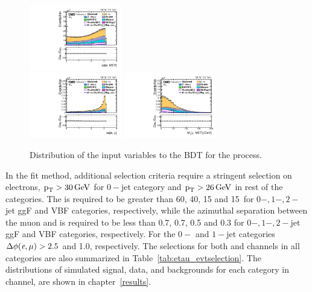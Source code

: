 \begin{figure}[htbp!]
  \includegraphics[width=0.36\textwidth]{plots/chapter6/emu/dPhiEMET.pdf}\\
  \includegraphics[width=0.36\textwidth]{plots/chapter6/emu/dPhiEMu.pdf}
  \includegraphics[width=0.36\textwidth]{plots/chapter6/emu/MTMuMET.pdf}\\
  \caption{Distribution of the input variables to the BDT for the \emu process.}
  \label{fig:input_em}
\end{figure}

In the \mcol fit method, additional selection criteria require a stringent selection on electrons, $\text{p}_\text{T} > 30 \,\text{Ge\hspace{-.08em}V}$ for $0-$jet category and $\text{p}_\text{T} > 26 \,\text{Ge\hspace{-.08em}V}$ in rest of the categories. The \mtemet is required to be greater than 60, 40, 15 and 15~\GeV for $0-, 1-, 2-$jet ggF and VBF categories, respectively, while the azimuthal separation between the muon and \ptvecmiss is required to be less than 0.7, 0.7, 0.5 and 0.3 for $0-, 1-, 2-$jet ggF and VBF categories, respectively. For the $0-$ and $1-$jet categories $\Delta\phi(\textit{e},\mu) > 2.5$ and 1.0, respectively. The selections for both \ehad and \emu channels in all categories are also summarized in Table~\ref{tab:etau_evtselection}. The \mcol distributions of simulated signal, data, and backgrounds for each category in \emu channel, are shown in chapter~\ref{results}.

